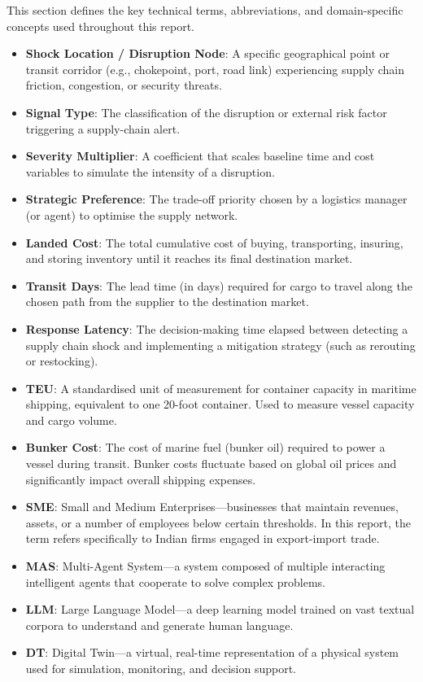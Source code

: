 This section defines the key technical terms, abbreviations, and domain-specific concepts used throughout this report.
\begin{itemize}
    \item \textbf{Shock Location / Disruption Node}: A specific geographical point or transit corridor (e.g., chokepoint, port, road link) experiencing supply chain friction, congestion, or security threats.
    \item \textbf{Signal Type}: The classification of the disruption or external risk factor triggering a supply-chain alert.
    \item \textbf{Severity Multiplier}: A coefficient that scales baseline time and cost variables to simulate the intensity of a disruption.
    \item \textbf{Strategic Preference}: The trade-off priority chosen by a logistics manager (or agent) to optimise the supply network.
    \item \textbf{Landed Cost}: The total cumulative cost of buying, transporting, insuring, and storing inventory until it reaches its final destination market.
    \item \textbf{Transit Days}: The lead time (in days) required for cargo to travel along the chosen path from the supplier to the destination market.
    \item \textbf{Response Latency}: The decision-making time elapsed between detecting a supply chain shock and implementing a mitigation strategy (such as rerouting or restocking).
    \item \textbf{\gls{TEU}}: A standardised unit of measurement for container capacity in maritime shipping, equivalent to one 20-foot container. Used to measure vessel capacity and cargo volume.
    \item \textbf{Bunker Cost}: The cost of marine fuel (bunker oil) required to power a vessel during transit. Bunker costs fluctuate based on global oil prices and significantly impact overall shipping expenses.
    \item \textbf{\gls{SME}}: Small and Medium Enterprises---businesses that maintain revenues, assets, or a number of employees below certain thresholds. In this report, the term refers specifically to Indian firms engaged in export-import trade.
    \item \textbf{\gls{MAS}}: Multi-Agent System---a system composed of multiple interacting intelligent agents that cooperate to solve complex problems.
    \item \textbf{\gls{LLM}}: Large Language Model---a deep learning model trained on vast textual corpora to understand and generate human language.
    \item \textbf{\gls{DT}}: Digital Twin---a virtual, real-time representation of a physical system used for simulation, monitoring, and decision support.
\end{itemize}

